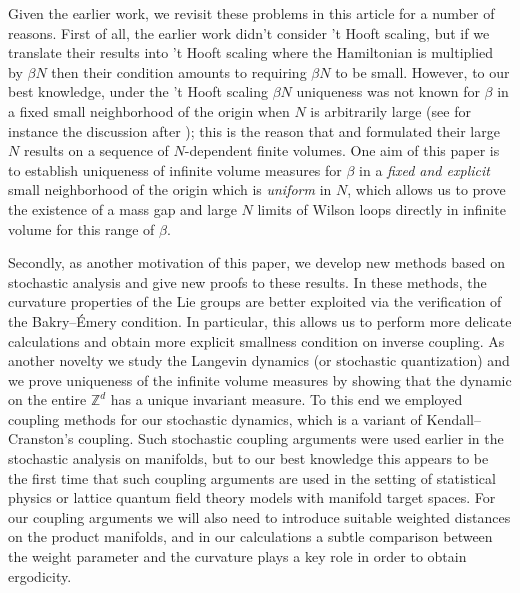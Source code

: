 \documentclass[11pt,UTF-8,reqno]{amsart}
\numberwithin{equation}{section}
\def\mZ{{\mathbb Z}}
\begin{document}
Given the earlier work, we revisit these problems in this article for a number of reasons.
First of all,
 the earlier work  \cite{OS1978} didn't consider 't Hooft scaling, but if we translate their results into 't Hooft scaling where the Hamiltonian is multiplied by $\beta N$ then their condition amounts to requiring $\beta N$ to be small. 
However, to our best knowledge,
 under the 't Hooft scaling $\beta N$ 
uniqueness was not known for $\beta$ in a fixed small neighborhood of the origin when $N$ is arbitrarily large (see for instance the discussion after \cite[Theorem 3.1]{Cha});
this is the reason that \cite{Cha} and \cite{Jafar} formulated 
their large $N$ results on a sequence of $N$-dependent finite volumes.
One aim of this paper is to establish uniqueness of  infinite volume measures  for $\beta$ in a {\it fixed and explicit}  small neighborhood of the origin which is {\it uniform} in $N$,
which allows us to prove
 the existence of a mass gap and large $N$ limits of Wilson loops directly in infinite volume for this range of $\beta$.


Secondly, as another motivation of this paper, 
we develop new methods  based on stochastic analysis 
and give new proofs to these results.
In these methods, the curvature properties of the Lie groups
are better exploited via the verification of the Bakry--\'Emery condition.
In particular, this allows us to perform more delicate calculations and obtain more explicit smallness condition on inverse coupling.
As another novelty we study the Langevin dynamics 
(or stochastic quantization) and we prove uniqueness of the infinite volume measures by showing that the dynamic on the entire $\mZ^d$ has a unique invariant measure.
To this end we employed coupling methods for our stochastic dynamics,
which is a variant of Kendall--Cranston's coupling.
Such stochastic coupling arguments were used earlier in the stochastic analysis 
on manifolds, but
to our best knowledge this appears to be the first time 
that such coupling arguments are used in the setting of
statistical physics or lattice quantum field theory models
with manifold target spaces.
For our coupling arguments we will also need to introduce suitable weighted 
distances on the product manifolds, 
and in our calculations a subtle comparison between the weight parameter
and the curvature plays a key role in order to obtain ergodicity.
\end{document}
